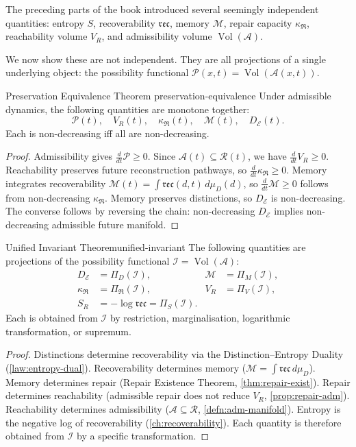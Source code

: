 \documentclass[12pt,twoside,openright]{book}
\newcommand{\reach}{\mathcal{R}}
\newcommand{\adm}{\mathcal{A}}
\newcommand{\repair}{\mathfrak{R}}
\newcommand{\reco}{\mathfrak{rec}}
\newcommand{\Vol}{\operatorname{Vol}}
\begin{document}
The preceding parts of the book introduced several
seemingly independent quantities:
entropy $S$, recoverability $\reco$, memory $\mathcal{M}$,
repair capacity $\kappa_\repair$, reachability volume $V_R$,
and admissibility volume $\Vol(\adm)$.

We now show these are not independent. They are all
projections of a single underlying object: the
possibility functional $\mathcal{P}(x,t) = \Vol(\adm(x,t))$.

\begin{theorem}{Preservation Equivalence Theorem}%
  {preservation-equivalence}
  Under admissible dynamics, the following quantities
  are monotone together:
  \[
    \mathcal{P}(t),\quad
    V_R(t),\quad
    \kappa_\repair(t),\quad
    \mathcal{M}(t),\quad
    D_\mathcal{E}(t).
  \]
  Each is non-decreasing iff all are non-decreasing.
\end{theorem}

\begin{proof}
  Admissibility gives $\frac{d}{dt}\mathcal{P} \ge 0$.
  Since $\adm(t) \subseteq \reach(t)$, we have
  $\frac{d}{dt}V_R \ge 0$.
  Reachability preserves future reconstruction pathways,
  so $\frac{d}{dt}\kappa_\repair \ge 0$.
  Memory integrates recoverability
  $\mathcal{M}(t) = \int \reco(d,t)\,d\mu_D(d)$,
  so $\frac{d}{dt}\mathcal{M} \ge 0$ follows from
  non-decreasing $\kappa_\repair$.
  Memory preserves distinctions, so $D_\mathcal{E}$
  is non-decreasing.
  The converse follows by reversing the chain:
  non-decreasing $D_\mathcal{E}$ implies non-decreasing
  admissible future manifold.
\end{proof}

\begin{theorem}{Unified Invariant Theorem}{unified-invariant}
  The following quantities are projections of the
  possibility functional $\mathcal{I} = \Vol(\adm)$:
  \begin{align*}
    D_\mathcal{E} &= \Pi_D(\mathcal{I}), &
    \mathcal{M} &= \Pi_M(\mathcal{I}), \\
    \kappa_\repair &= \Pi_\repair(\mathcal{I}), &
    V_R &= \Pi_V(\mathcal{I}), \\
    S_R &= -\log\reco = \Pi_S(\mathcal{I}).
  \end{align*}
  Each is obtained from $\mathcal{I}$ by restriction,
  marginalisation, logarithmic transformation, or
  supremum.
\end{theorem}

\begin{proof}
  Distinctions determine recoverability via the
  Distinction--Entropy Duality (\cref{law:entropy-dual}).
  Recoverability determines memory
  ($\mathcal{M} = \int\reco\,d\mu_D$).
  Memory determines repair (Repair Existence Theorem,
  \cref{thm:repair-exist}).
  Repair determines reachability (admissible repair
  does not reduce $V_R$, \cref{prop:repair-adm}).
  Reachability determines admissibility
  ($\adm \subseteq \reach$, \cref{defn:adm-manifold}).
  Entropy is the negative log of recoverability
  (\cref{ch:recoverability}).
  Each quantity is therefore obtained from
  $\mathcal{I}$ by a specific transformation.
\end{proof}
\end{document}
